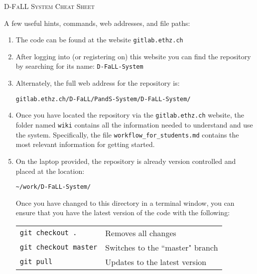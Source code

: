 \documentclass[]{report}
\newcommand{\repositoryrootpath}{\textasciitilde/work/D-FaLL-System/}
\begin{document}
	
\begin{center}
	\huge{\textsc{D-FaLL System Cheat Sheet}}
\end{center}

\noindent
A few useful hints, commands, web addresses, and file paths:
	\begin{enumerate}[topsep=-1pt , itemsep=1pt ,  label = \textbf{(\arabic{*})} ]
		\item The code can be found at the website \texttt{gitlab.ethz.ch}
		
		\item After logging into (or registering on) this website you can find the repository by searching for its name: \texttt{D-FaLL-System}
		
		\item Alternately, the full web address for the repository is:
		
		\begin{center}
			\large{\texttt{gitlab.ethz.ch/D-FaLL/PandS-System/D-FaLL-System/}}
		\end{center}
		
		
		\item Once you have located the repository via the \texttt{gitlab.ethz.ch} website, the folder named \texttt{wiki} contains all the information needed to understand and use the system. Specifically, the file \texttt{workflow\_for\_students.md} contains the most relevant information for getting started.
		
		\item On the laptop provided, the repository is already version controlled and placed at the location:
		
		\begin{center}
			\large{\texttt{\repositoryrootpath}}
		\end{center}
		
		Once you have changed to this directory in a terminal window, you can ensure that you have the latest version of the code with the following:
		
		\begin{center}
			\begin{tabular}{ll}
				\large{\texttt{git checkout .}}
					& Removes all changes
				\\
				\large{\texttt{git checkout master}}
					& Switches to the ``master" branch
				\\
				\large{\texttt{git pull}}
					& Updates to the latest version
			\end{tabular}
		\end{center}
		

\end{enumerate}
\end{document}
